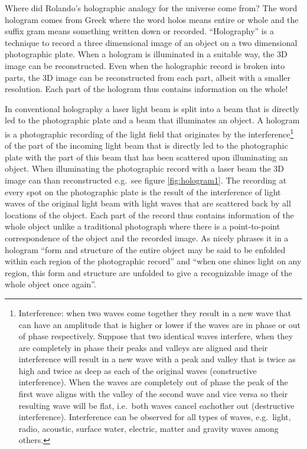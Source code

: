 \documentclass[
  11pt,
]{book}
\begin{document}
Where did Rolando's holographic analogy for the universe come from?
The word hologram comes from Greek where the word holos means entire or whole and the suffix gram means something written down or recorded.
``Holography'' is a technique to record a three dimensional image of an object on a two dimensional photographic plate. When a hologram is illuminated in a suitable way, the 3D image can be reconstructed. Even when the holographic record is broken into parts, the 3D image can be reconstructed from each part, albeit with a smaller resolution. Each part of the hologram thus contains information on the whole!

In conventional holography a laser light beam is split into a beam that is directly led to the photographic plate and a beam that illuminates an object. A hologram is a photographic recording of the light field that originates by the interference\footnote{Interference: when two waves come together they result in a new wave that can have an amplitude that is higher or lower if the waves are in phase or out of phase respectively. Suppose that two identical waves interfere, when they are completely in phase their peaks and valleys are aligned and their interference will result in a new wave with a peak and valley that is twice as high and twice as deep as each of the original waves (constructive interference). When the waves are completely out of phase the peak of the first wave aligns with the valley of the second wave and vice versa so their resulting wave will be flat, i.e.~both waves cancel eachother out (destructive interference). Interference can be observed for all types of waves, e.g.~light, radio, acoustic, surface water, electric, matter and gravity waves among others.} of the part of the incoming light beam that is directly led to the photographic plate with the part of this beam that has been scattered upon illuminating an object.
When illuminating the photographic record with a laser beam the 3D image can than reconstructed e.g.~see figure \ref{fig:hologram1}. The recording at every spot on the photographic plate is the result of the interference of light waves of the original light beam with light waves that are scattered back by all locations of the object. Each part of the record thus contains information of the whole object unlike a traditional photograph where there is a point-to-point correspondence of the object and the recorded image. As \citet{bohm1980} nicely phrases it in a hologram ``form and structure of the entire object may be said to be enfolded within each region of the photographic record'' and ``when one shines light on any region, this form and structure are unfolded to give a recognizable image of the whole object once again''.
\end{document}
